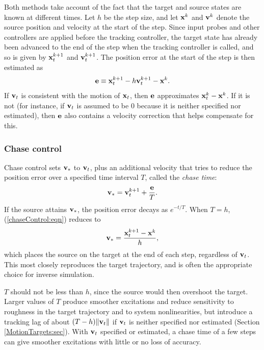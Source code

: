 Both methods take account of the fact that the target and source states are
known at different times. Let $h$ be the step size, and let ${\bf x}^k$ and ${\bf v}^k$
denote the source position and velocity at the start of the step. Since input
probes and other controllers are applied before the tracking controller, the
target state has already been advanced to the end of the step when the
tracking controller is called, and so is given by ${\bf x}_t^{k+1}$ and
${\bf v}_t^{k+1}$. The position error at the start of the step is then estimated as
%
\begin{equation}
{\bf e} \equiv {\bf x}_t^{k+1} - h {\bf v}_t^{k+1} - {\bf x}^k.
\label{trackingPosError:eqn}
\end{equation}
%
If ${\bf v}_t$ is consistent with the motion of ${\bf x}_t$, then ${\bf e}$ approximates
${\bf x}_t^k - {\bf x}^k$. If it is not (for instance, if ${\bf v}_t$ is assumed to be 0
because it is neither specified nor estimated), then ${\bf e}$ also contains a
velocity correction that helps compensate for this.

\subsubsection{Chase control}
\label{ChaseControl:sec}

Chase control sets ${\bf v}_*$ to ${\bf v}_t$, plus an additional velocity that tries to
reduce the position error over a specified time interval $T$, called the {\it
chase time}:
%
\begin{equation}
{\bf v}_* = {\bf v}_t^{k+1} + \frac{{\bf e}}{T}.
\label{chaseControl:eqn}
\end{equation}
%
If the source attains ${\bf v}_*$, the position error decays as $e^{-t/T}$.
When $T = h$, (\ref{chaseControl:eqn}) reduces to
%
\begin{equation*}
{\bf v}_* = \frac{{\bf x}_t^{k+1} - {\bf x}^k}{h},
\end{equation*}
%
which places the source on the target at the end of each step, regardless of
${\bf v}_t$. This most closely reproduces the target trajectory, and is often
the appropriate choice for inverse simulation.

$T$ should not be less than $h$, since the source would then overshoot the
target.  Larger values of $T$ produce smoother excitations and reduce
sensitivity to roughness in the target trajectory and to system nonlinearities,
but introduce a tracking lag of about $(T-h) \|{\bf v}_t\|$ if ${\bf v}_t$ is neither
specified nor estimated (Section \ref{MotionTargets:sec}). With ${\bf v}_t$
specified or estimated, a chase time of a few steps can give smoother
excitations with little or no loss of accuracy.

